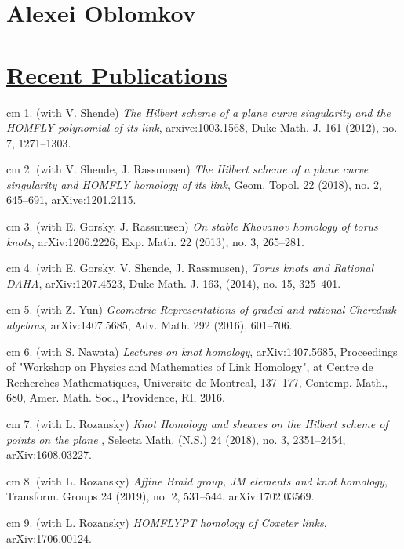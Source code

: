 \documentclass[11pt]{amsart}
\theoremstyle{plain}
\theoremstyle{definition}
\theoremstyle{remark}
\begin{document}
\section*{\bf{\huge Alexei Oblomkov}}


\section*{\Large\underline{Recent Publications}}
\noindent{} cm 1. (with V. Shende) 
{\it The Hilbert scheme of a plane curve singularity and the HOMFLY polynomial of its link}, arxive:1003.1568,
  Duke Math. J. 161 (2012), no. 7, 1271--1303.

\noindent{} cm 2. (with V. Shende, J. Rassmusen)
{\it The Hilbert scheme of a plane curve singularity and HOMFLY homology of its link},  Geom. Topol. 22 (2018), no. 2, 645--691, arXive:1201.2115.


\noindent{} cm 3. (with E. Gorsky, J. Rassmusen) {\it On stable Khovanov homology of torus knots},    arXiv:1206.2226,  Exp. Math. 22 (2013), no. 3, 265--281.

\noindent{} cm 4. (with E. Gorsky, V. Shende, J. Rassmusen), {\it Torus knots and Rational DAHA},   arXiv:1207.4523,  Duke Math. J. 163, (2014), no. 15, 325--401. 

\noindent{} cm 5. (with Z. Yun) {\it Geometric Representations of graded and rational Cherednik algebras},   arXiv:1407.5685,
 Adv. Math. 292 (2016), 601--706.

\noindent{} cm 6. (with S. Nawata) {\it Lectures on knot homology},   arXiv:1407.5685,   Proceedings of "Workshop on Physics and Mathematics of Link Homology", at Centre de Recherches Mathematiques, Universite de Montreal,  137--177, Contemp. Math., 680, Amer. Math. Soc., Providence, RI, 2016.


\noindent{} cm 7. (with L. Rozansky) {\it Knot Homology and sheaves on the Hilbert scheme of points on the plane },
Selecta Math. (N.S.) 24 (2018), no. 3, 2351--2454,  arXiv:1608.03227.



\noindent{} cm 8. (with L. Rozansky) {\it Affine Braid group, JM elements and knot homology},
Transform. Groups 24 (2019), no. 2, 531--544. arXiv:1702.03569.


\noindent{} cm 9. (with L. Rozansky) {\it HOMFLYPT homology of Coxeter links},  arXiv:1706.00124.
\end{document}
